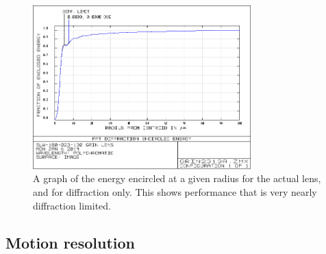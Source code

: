\begin{figure}[h!]
\centering
\includegraphics[width=0.75\textwidth]{Images/Zemax/GRO-encircledenergy.png}
\caption{A graph of the energy encircled at a given radius for the actual lens, and for diffraction only. This shows performance that is very nearly diffraction limited.}
\end{figure}

\subsection{Motion resolution}
